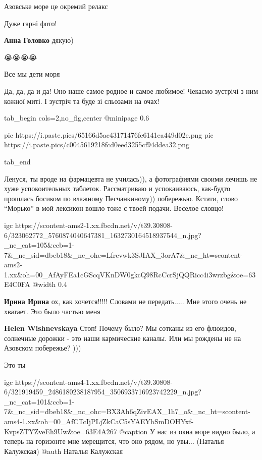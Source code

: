 
Азовське море це окремий релакс 💙💛


Дуже гарні фото!

\textbf{Анна Головко} дякую)

😭😭😭😭


Все мы дети моря


Да, да, да и да! Оно наше самое родное и самое любимое! Чекаємо зустрічі з ним
кожної миті. І зустріч та буде зі сльозами на очах!



\ifcmt
  tab_begin cols=2,no_fig,center
		 @minipage 0.6

     pic https://i.paste.pics/65166d5ac43171476fe6141ea449d02e.png
		 pic https://i.paste.pics/c0045619218fcd0eed3255cf94ddea32.png

  tab_end
\fi


Ленуся, ты вроде на фармацевта не училась)), а фотографиями своими лечишь не
хуже успокоительных таблеток. Рассматриваю и успокаиваюсь, как-будто прошлась
босиком по влажному Песчанкиному)) побережью. Кстати, слово \enquote{Морько} в мой
лексикон вошло тоже с твоей подачи. Веселое словцо!


\ifcmt
  igc https://scontent-ams2-1.xx.fbcdn.net/v/t39.30808-6/323062772_5760874040647381_1632730164518937544_n.jpg?_nc_cat=105&ccb=1-7&_nc_sid=dbeb18&_nc_ohc=Lfrcvwk3SJIAX_3orA7&_nc_ht=scontent-ams2-1.xx&oh=00_AfAyFEa1cGScqVKnDW0gkcQ98RcCcrSjQQRicc4i3wrzbg&oe=63E4C0FA
	@width 0.4
\fi

\begin{itemize} %
\textbf{Ирина Ирина} ох, как хочется!!!!! Словами не передать..... Мне этого очень не хватает. Это было частью меня

\textbf{Helen Wishnevskaya} Стоп! Почему было? Мы сотканы из его флюидов, солнечные дорожки - это наши кармические каналы. Или мы рождены не на Азовском побережье? )))
\end{itemize} %


Это ты


\ifcmt
  igc https://scontent-ams4-1.xx.fbcdn.net/v/t39.30808-6/321919459_2486180238187954_3506933716923742229_n.jpg?_nc_cat=101&ccb=1-7&_nc_sid=dbeb18&_nc_ohc=BX3Ah6qZivEAX_1h7_o&_nc_ht=scontent-ams4-1.xx&oh=00_AfCTcIjPLjZkCaC5sYAEYhSmDOHYxf-KvpsZTYZveEh9Uw&oe=63E4A267
	@caption У нас из окна море видно было, а теперь на горизонте мне мерещится, что оно рядом, но увы... (Наталья Калужская)
	@auth Наталья Калужская
\fi
